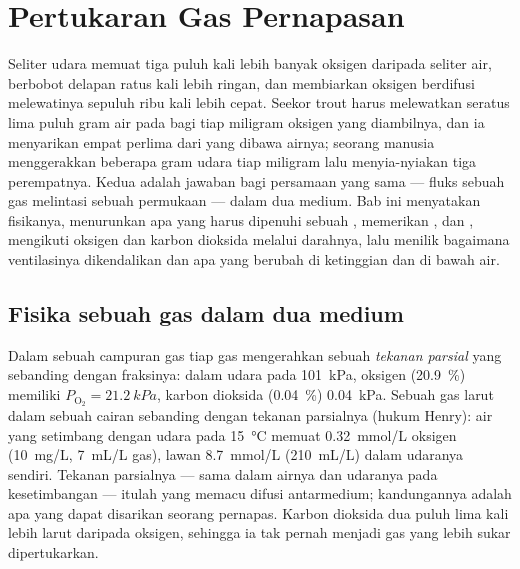 \chapter{Pertukaran Gas Pernapasan}\label{ch:b1:gas-exchange}

Seliter udara memuat tiga puluh kali lebih banyak oksigen daripada
seliter air, berbobot delapan ratus kali lebih ringan, dan
membiarkan oksigen berdifusi melewatinya sepuluh ribu kali lebih
cepat. Seekor trout harus melewatkan seratus lima puluh gram air pada
 bagi tiap miligram oksigen yang diambilnya, dan ia menyarikan
empat perlima dari yang dibawa airnya; seorang manusia menggerakkan
beberapa gram udara tiap miligram lalu menyia-nyiakan tiga
perempatnya. Kedua  adalah jawaban bagi persamaan yang sama
--- fluks sebuah gas melintasi sebuah permukaan --- dalam dua medium.
Bab ini menyatakan fisikanya, menurunkan apa yang harus dipenuhi
sebuah , memerikan ,  dan ,
mengikuti oksigen dan karbon dioksida melalui darahnya, lalu menilik
bagaimana ventilasinya dikendalikan dan apa yang berubah di ketinggian
dan di bawah air.

\section{Fisika sebuah gas dalam dua medium}

\begin{definition}\label{def:b1:gas-exchange:partial}
Dalam sebuah campuran gas tiap gas mengerahkan sebuah \emph{tekanan
parsial} yang sebanding dengan fraksinya: dalam udara pada
\qty{101}{kPa}, oksigen (\qty{20.9}{\%}) memiliki
$P_{\mathrm{O_2}} = \qty{21.2}{kPa}$, karbon dioksida
(\qty{0.04}{\%}) \qty{0.04}{kPa}.
Sebuah gas larut dalam sebuah cairan sebanding dengan tekanan
parsialnya (hukum Henry): air yang setimbang dengan udara pada
\qty{15}{\celsius} memuat \qty{0.32}{mmol/L} oksigen (\qty{10}{mg/L},
\qty{7}{mL/L} gas), lawan \qty{8.7}{mmol/L} (\qty{210}{mL/L}) dalam
udaranya sendiri. Tekanan parsialnya --- sama dalam airnya dan
udaranya pada kesetimbangan --- itulah yang memacu difusi antarmedium;
kandungannya adalah apa yang dapat disarikan seorang pernapas. Karbon
dioksida dua puluh lima kali lebih larut daripada oksigen, sehingga ia
tak pernah menjadi gas yang lebih sukar dipertukarkan.
\end{definition}

